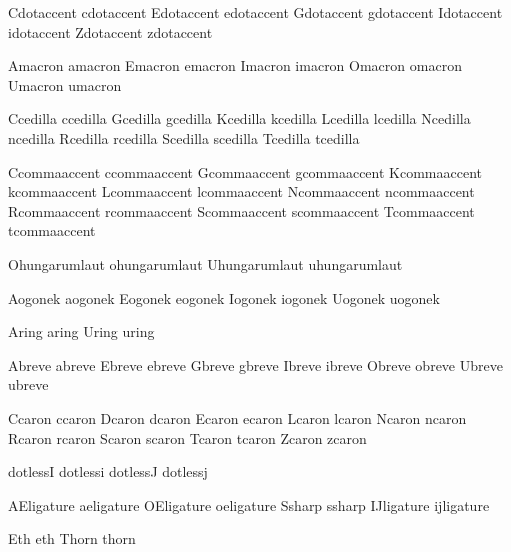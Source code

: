  Cdotaccent cdotaccent
 Edotaccent edotaccent
 Gdotaccent gdotaccent
 Idotaccent idotaccent
 Zdotaccent zdotaccent

 Amacron amacron
 Emacron emacron
 Imacron imacron
 Omacron omacron
 Umacron umacron

 Ccedilla ccedilla
 Gcedilla gcedilla %
 Kcedilla kcedilla %
 Lcedilla lcedilla %
 Ncedilla ncedilla %
 Rcedilla rcedilla %
 Scedilla scedilla
 Tcedilla tcedilla

 Ccommaaccent ccommaaccent
 Gcommaaccent gcommaaccent
 Kcommaaccent kcommaaccent
 Lcommaaccent lcommaaccent
 Ncommaaccent ncommaaccent
 Rcommaaccent rcommaaccent
 Scommaaccent scommaaccent
 Tcommaaccent tcommaaccent

 Ohungarumlaut ohungarumlaut
 Uhungarumlaut uhungarumlaut

 Aogonek aogonek
 Eogonek eogonek
 Iogonek iogonek
 Uogonek uogonek

 Aring aring
 Uring uring

 Abreve abreve
 Ebreve ebreve
 Gbreve gbreve
 Ibreve ibreve
 Obreve obreve
 Ubreve ubreve

 Ccaron ccaron
 Dcaron dcaron
 Ecaron ecaron
 Lcaron lcaron
 Ncaron ncaron
 Rcaron rcaron
 Scaron scaron
 Tcaron tcaron
 Zcaron zcaron

 dotlessI dotlessi
 dotlessJ dotlessj

 AEligature aeligature
 OEligature oeligature
 Ssharp     ssharp
 IJligature ijligature

 Eth   eth
 Thorn thorn

\endinput
